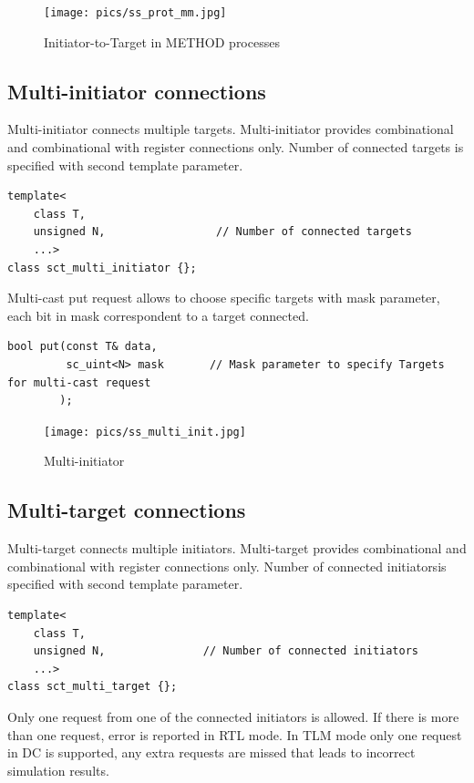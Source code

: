 \begin{figure}[!htb]
\centering
\texttt{[image: pics/ss\_prot\_mm.jpg]}
\caption{Initiator-to-Target in METHOD processes}
\label{fig:ss_usage}
\end{figure}


\ifdefined\INTEL
\subsection{Multi-initiator connections}

Multi-initiator connects multiple targets. Multi-initiator provides combinational and combinational with register connections only. Number of connected targets is specified with second template parameter.

\begin{lstlisting}[style=mycpp]
template<
    class T, 
    unsigned N,       			// Number of connected targets
    ...>
class sct_multi_initiator {};
\end{lstlisting}

Multi-cast put request allows to choose specific targets with mask parameter, each bit in mask correspondent to a target connected.

\begin{lstlisting}[style=mycpp]
bool put(const T& data, 
         sc_uint<N> mask       // Mask parameter to specify Targets for multi-cast request
        );         
\end{lstlisting}

\begin{figure}[!htb]
\centering
\texttt{[image: pics/ss\_multi\_init.jpg]}
\caption{Multi-initiator}
\label{fig:ss_multi_init}
\end{figure}


\subsection{Multi-target connections}
Multi-target connects multiple initiators. Multi-target provides combinational and combinational with register connections only. Number of connected initiatorsis specified with second template parameter.

\begin{lstlisting}[style=mycpp]
template<
    class T, 
    unsigned N,               // Number of connected initiators
    ...>
class sct_multi_target {};
\end{lstlisting}

Only one request from one of the connected initiators is allowed. If there is more than one request, error is reported in RTL mode. In TLM mode only one request in DC is supported, any extra requests are missed that leads to incorrect simulation results.

